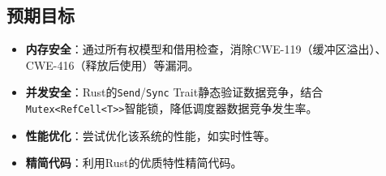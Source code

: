 \subsection{预期目标}

\begin{itemize}
    \item \textbf{内存安全}：通过所有权模型和借用检查，消除CWE-119（缓冲区溢出）、CWE-416（释放后使用）等漏洞。
    \item \textbf{并发安全}：Rust的\texttt{Send}/\texttt{Sync} Trait静态验证数据竞争，结合\texttt{Mutex<RefCell<T>>}智能锁，降低调度器数据竞争发生率。
    \item \textbf{性能优化}：尝试优化该系统的性能，如实时性等。
    \item \textbf{精简代码}：利用Rust的优质特性精简代码。
\end{itemize}